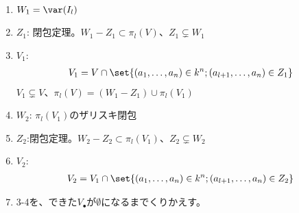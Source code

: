 \begin{enumerate}
  \item $W_1 = \var(I_l)$
  \item
  $Z_1$: 閉包定理。$W_1 - Z_1 \subset \pi_l(V)$、$Z_1 \subsetneq W_1$
  \item $V_1$:
  \begin{align}
    V_1 = V \cap \set{(a_1,\dots,a_n)\in k^n; (a_{l+1},\dots,a_n)\in Z_1}
  \end{align}
  $V_1 \subsetneq V$、$\pi_l(V) = (W_1-Z_1) \cup \pi_l(V_1)$
  \item
  $W_2$: $\pi_l(V_1)$のザリスキ閉包
  \item
  $Z_2$:閉包定理。$W_2 - Z_2 \subset \pi_l(V_1)$、$Z_2 \subsetneq W_2$
  \item
  $V_2$:
  \begin{align}
    V_2 = V_1 \cap \set{(a_1,\dots,a_n)\in k^n; (a_{l+1},\dots,a_n)\in Z_2}
  \end{align}
  \item
  3-4を、できた$V_\bullet$が$\emptyset$になるまでくりかえす。
\end{enumerate}

